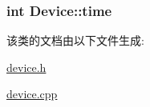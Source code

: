 \subsubsection[{\texorpdfstring{time}{time}}]{\setlength{\rightskip}{0pt plus 5cm}int Device\+::time\hspace{0.3cm}{\ttfamily [read]}}\hypertarget{class_device_a02388ba20565bf3fb965562dc8a80220}{}\label{class_device_a02388ba20565bf3fb965562dc8a80220}


该类的文档由以下文件生成\+:\begin{DoxyCompactItemize}
\item 
\hyperlink{device_8h}{device.\+h}\item 
\hyperlink{device_8cpp}{device.\+cpp}\end{DoxyCompactItemize}
